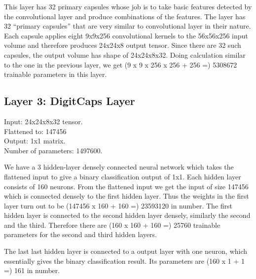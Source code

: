 \par\bigskip This layer has 32 primary capsules whose job is to take basic features detected by the convolutional layer and produce combinations of the features. The layer has 32 “primary capsules” that are very similar to convolutional layer in their nature. Each capsule applies eight 9x9x256 convolutional kernels to the 56x56x256 input volume and therefore produces 24x24x8 output tensor. Since there are 32 such capsules, the output volume has shape of 24x24x8x32. Doing calculation similar to the one in the previous layer, we get (9 x 9 x 256 x 256 + 256 =) 5308672 trainable parameters in this layer.


\subsection{Layer 3: DigitCaps Layer} %
\label{sub:layer_3_digitcaps_layer}
\noindent Input: 24x24x8x32 tensor.
\\Flattened to: 147456
\\Output: 1x1 matrix.
\\Number of parameters: 1497600.

\par\bigskip We have a 3 hidden-layer densely connected neural network which takes the flattened input to give a binary classification output of 1x1. Each hidden layer consists of 160 neurons. From the flattened input we get the input of size 147456 which is connected densely to the first hidden layer. Thus the weights in the first layer turn out to be (147456 x 160 + 160 =)  23593120 in number. The first hidden layer is connected to the second hidden layer densely, similarly the second and the third. Therefore there are (160 x 160 + 160 =) 25760 trainable parameters for the second and third hidden layers. 
\par\bigskip The last last hidden layer is connected to a output layer with one neuron, which essentially gives the binary classification result. Its parameters are (160 x 1 + 1 =) 161 in number. 




